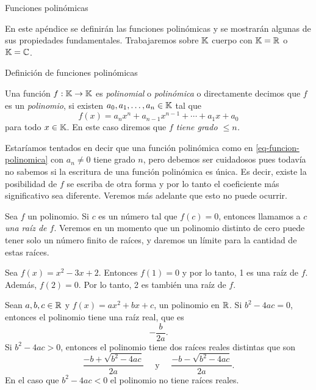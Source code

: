           
    \begin{chapter}{Funciones polin\'omicas} 
    
        En este apéndice se definirán las funciones polinómicas y se mostrarán algunas de sus propiedades fundamentales. Trabajaremos sobre $\mathbb K$  cuerpo con $\mathbb K=\mathbb R$ o $\mathbb K=\mathbb C$. 
        
        \begin{section}{Definici\'on de funciones polin\'omicas}\label{seccion-definicion-polinomios}
            
        
        \begin{definicion}
                Una función $f: \mathbb K \to \mathbb K$ es \textit{polinomial} o \textit{polinómica} o directamente decimos que $f$  es  un \textit{polinomio}, si existen $a_0,a_1,\ldots,a_n \in \mathbb K$ tal que
                \begin{equation}\label{eq-funcion-polinomica}
                    f(x) = a_nx^n + a_{n-1}x^{n-1}+\cdots + a_1x +a_0 
                \end{equation}
                para todo $x \in \mathbb K$. En  este caso  diremos que  \textit{$f$ tiene grado $\le n$.}
        \end{definicion}
    
        Estaríamos tentados en decir que  una función polinómica como en \eqref{eq-funcion-polinomica} con $a_n\ne0$ tiene grado $n$, pero debemos ser cuidadosos pues todavía no sabemos si la escritura de una función polinómica es única. Es  decir,  existe la posibilidad de $f$  se escriba de otra forma y por lo tanto el coeficiente más significativo sea diferente. Veremos más adelante que esto no puede ocurrir. 
        
        Sea $f$ un polinomio. Si $c$ es un número tal que $f (c) = 0$, entonces llamamos a \textit{$c$ una raíz de $f$}. Veremos en un momento que un polinomio distinto de cero puede tener solo un número finito de raíces, y daremos un límite para la cantidad de estas raíces.
        
        \begin{ejemplo*}
            Sea $f (x) = x^2 - 3x + 2$. Entonces $f(1)=0$ y por lo tanto, 1 es una raíz de $f$.
            Además, $f (2) = 0$. Por lo tanto, 2 es también una raíz de $f$.
        \end{ejemplo*}
    
        \begin{ejemplo*}
            Sean $a,b,c \in \mathbb R$ y  $f(x) = ax^2 + bx + c$, un polinomio en $\mathbb R$.  Si $b^2 - 4 ac = 0$, entonces el polinomio tiene una raíz real, que es
            \begin{equation*}
                -\frac{b}{2a}.
            \end{equation*}
            Si $b^2 - 4 ac > 0$, entonces el polinomio tiene dos raíces reales distintas que son
            \begin{equation*}
                \frac{-b + \sqrt{b^2 - 4 ac}}{2a}\quad \text{ y }\quad \frac{-b - \sqrt{b^2 - 4 ac}}{2a}. 
            \end{equation*}
            En el caso que $b^2 - 4 ac < 0$ el polinomio no tiene raíces reales. 
        \end{ejemplo*}
        

\end{section}
\end{chapter}
